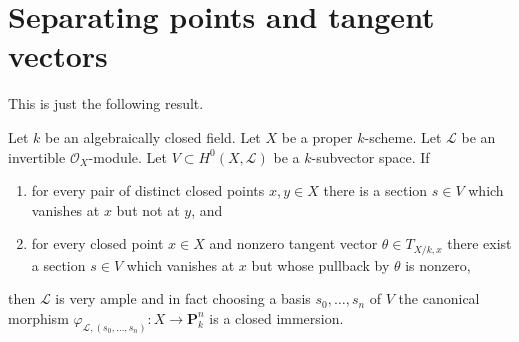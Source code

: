 \section{Separating points and tangent vectors}
\label{section-separating-points-tangent-vectors}

\noindent
This is just the following result.

\begin{lemma}
\label{lemma-separate-points-tangent-vectors}
Let $k$ be an algebraically closed field.
Let $X$ be a proper $k$-scheme.
Let $\mathcal{L}$ be an invertible $\mathcal{O}_X$-module.
Let $V \subset H^0(X, \mathcal{L})$ be a $k$-subvector space. If
\begin{enumerate}
\item for every pair of distinct closed points $x, y \in X$
there is a section $s \in V$ which vanishes at $x$ but not at $y$, and
\item for every closed point $x \in X$ and nonzero tangent vector
$\theta \in T_{X/k, x}$ there exist a section $s \in V$
which vanishes at $x$ but whose pullback by $\theta$ is nonzero,
\end{enumerate}
then $\mathcal{L}$ is very ample and in fact choosing a
basis $s_0, \ldots, s_n$ of $V$ the canonical morphism
$\varphi_{\mathcal{L}, (s_0, \ldots, s_n)} : X \to \mathbf{P}^n_k$
is a closed immersion.
\end{lemma}

